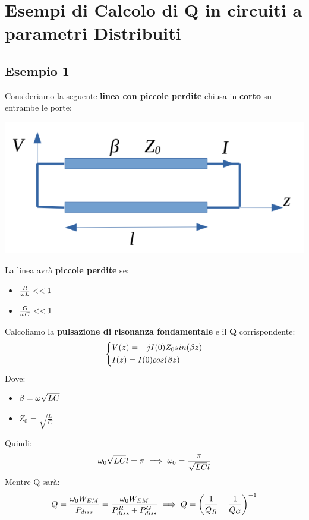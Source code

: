 \section{Esempi di Calcolo di Q in circuiti a parametri Distribuiti}
\subsection{Esempio 1}
Consideriamo la seguente \textbf{linea con piccole perdite} chiusa in \textbf{corto} su entrambe le porte:

\begin{center}
    \includegraphics[width=.8\textwidth]{Images/figure28.png}
\end{center}
La linea avrà \textbf{piccole perdite} se:
\begin{itemize}
    \item $\frac{R}{\omega L} << 1$\\
    \item $\frac{G}{\omega C} << 1$
\end{itemize}
Calcoliamo la \textbf{pulsazione di risonanza fondamentale} e il \textbf{Q} corrispondente:
\begin{equation*}
    \begin{dcases}
    V(z) = - j I(0) Z_0 sin(\beta z)\\
    I(z) = I(0) cos(\beta z)
    \end{dcases}
\end{equation*}
Dove:
\begin{itemize}
    \item $\beta = \omega \sqrt{LC}$\\
    \item $Z_0 = \sqrt{\frac{L}{C}}$
\end{itemize}
Quindi:
\begin{equation*}
    \omega_0 \sqrt{LC} l = \pi \implies \omega_0 = \frac{\pi}{\sqrt{LC} l}
\end{equation*}
Mentre Q sarà:
\begin{equation*}
    Q = \frac{\omega_0 W_{EM}}{P_{diss}} = \frac{\omega_0 W_{EM}}{P^R_{diss}+ P^G_{diss}} \implies Q = \left(\frac{1}{Q_R} + \frac{1}{Q_G}\right)^{-1}
\end{equation*}
